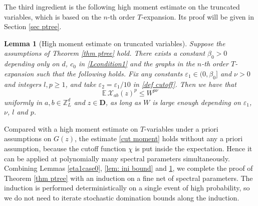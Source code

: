 \documentclass{article}
\newcommand{\1}{\mathds{1}}
\numberwithin{equation}{section}
\newcommand{\be}{\begin{equation}}
\newcommand{\ee}{\end{equation}}
\newcommand{\e}{{\varepsilon}}
\renewcommand{\cal}{\mathcal}
\renewcommand{\leq}{\leqslant}
\renewcommand{\geq}{\geqslant}
\renewcommand{\le}{\leq}
\renewcommand{\ge}{\geq}
\newcommand{\E}{\mathbb{E}}
\newcommand{\Z}{\mathbb{Z}}
\theoremstyle{plain} %
\newtheorem{lemma}[theorem]{Lemma}
\theoremstyle{remark}
\begin{document}
The third ingredient is the following high moment estimate on the truncated variables, which is based on the $n$-th order $T$-expansion. Its proof will be given in Section \ref{sec ptree}.

 \begin{lemma}[High moment estimate on truncated variables]\label{lemma ptree}
Suppose the assumptions of Theorem \ref{thm ptree} hold. There exists a constant $\beta_0>0$ depending only on $d$, $c_0$ in \eqref{Lcondition1} and the graphs in the $n$-th order $T$-expansion such that the following holds. Fix any constants $\e_1\in (0,\beta_0]$ and $\nu>0$ and integers $l,p\ge 1$, and take $\e_2=\e_1/10$ in \eqref{def cutoff}. Then we have that
\be\label{cut moment}
\E\, \cal X_{ab}(z)^p\le W^{p\nu}
\ee
uniformly in $a,b\in \Z_L^d$ and $z\in \mathbf D$, as long as $W$ is large enough depending on $\e_1$, $\nu$, $l$ and $p$.
 \end{lemma}

Compared with a high moment estimate on $T$-variables under a priori assumptions on $G(z)$, the estimate \eqref{cut moment} holds without any a priori assumption, because the cutoff function $\chi$ is put inside the expectation. Hence it can be applied at polynomially many spectral parameters simultaneously. Combining Lemmas \ref{eta1case0}, \ref{lem: ini bound} and \ref{lemma ptree}, we complete the proof of Theorem \ref{thm ptree} with an induction on a fine net of spectral parameters. The induction is performed deterministically on a single event of high probability, so we do not need to iterate stochastic domination bounds along the induction.
 
 
 
\end{document}
